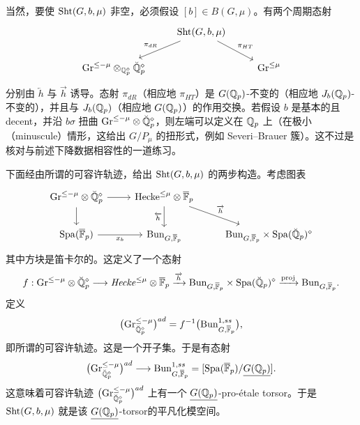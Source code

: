 当然，要使 $\operatorname{Sht}(G,b,\mu)$ 非空，必须假设 $[b]\in B(G,\mu)$。有两个周期态射
\begin{equation*}
\begin{tikzcd}
& \Sht(G,b,\mu) \arrow[dl,"\pi_{dR}"'] \arrow[dr,"\pi_{HT}"] & \\
\Gr^{\le-\mu}\otimes_{\QQ_p^{\diamond}}\breve{\QQ}_p^{\diamond} & & \Gr^{\le\mu}
\end{tikzcd}
\end{equation*}
分别由 $\overleftarrow{h}$ 与 $\overrightarrow{h}$ 诱导。态射 $\pi_{dR}$（相应地 $\pi_{HT}$）是 $G(\mathbb{Q}_p)$-不变的（相应地 $J_b(\mathbb{Q}_p)$-不变的），并且与 $J_b(\mathbb{Q}_p)$（相应地 $G(\mathbb{Q}_p)$）的作用交换。若假设 $b$ 是基本的且 decent，并沿 $b\sigma$ 扭曲 $\mathrm{Gr}^{\le-\mu}\otimes\breve{\mathbb{Q}}_p^{\diamond}$，则左端可以定义在 $\mathbb{Q}_p$ 上（在极小（minuscule）情形，这给出 $G/P_\mu$ 的扭形式，例如 Severi--Brauer 簇）。这不过是核对与前述下降数据相容性的一道练习。


下面经由所谓的可容许轨迹，给出 $\operatorname{Sht}(G,b,\mu)$ 的两步构造。考虑图表
\begin{equation*}
\begin{tikzcd}
\Gr^{\le-\mu}\otimes\breve{\QQ}_p^{\diamond} \arrow[r] \arrow[d]
& \mathrm{Hecke}^{\le\mu}\otimes\ol{\FF}_p \arrow[d,"\overleftarrow{h}"'] \arrow[dr,"\overrightarrow{h}"] & \\
\Spa(\ol{\FF}_p) \arrow[r,"x_b"']
& \Bun_{G,\ol{\FF}_p} & \Bun_{G,\ol{\FF}_p}\times\Spa(\breve{\QQ}_p)^{\diamond}
\end{tikzcd}
\end{equation*}
其中方块是笛卡尔的。这定义了一个态射
\[
f:\mathrm{Gr}^{\le-\mu}\otimes\breve{\mathbb{Q}}_p^{\diamond}\longrightarrow\mathit{Hecke}^{\le\mu}\otimes\overline{\mathbb{F}}_p\xrightarrow{\overrightarrow{h}}\mathrm{Bun}_{G,\overline{\mathbb{F}}_p}\times\mathrm{Spa}(\breve{\mathbb{Q}}_p)^{\diamond}\xrightarrow{\mathrm{proj}}\mathrm{Bun}_{G,\overline{\mathbb{F}}_p}.
\]
定义
\[
\big(\mathrm{Gr}^{\le-\mu}_{\breve{\mathbb{Q}}_p^{\diamond}}\big)^{ad}=f^{-1}\big(\mathrm{Bun}^{1,ss}_{G,\overline{\mathbb{F}}_p}\big),
\]
即所谓的可容许轨迹。这是一个开子集。于是有态射
\[
\big(\mathrm{Gr}^{\le-\mu}_{\breve{\mathbb{Q}}_p^{\diamond}}\big)^{ad}\longrightarrow\mathrm{Bun}^{1,ss}_{G,\overline{\mathbb{F}}_p}=[\mathrm{Spa}(\overline{\mathbb{F}}_p)/\underline{G(\mathbb{Q}_p)}].
\]
这意味着可容许轨迹 $\big(\mathrm{Gr}^{\le-\mu}_{\breve{\mathbb{Q}}_p^{\diamond}}\big)^{ad}$ 上有一个 $\underline{G(\mathbb{Q}_p)}$-pro-étale torsor。于是 $\operatorname{Sht}(G,b,\mu)$ 就是该 $\underline{G(\mathbb{Q}_p)}$-torsor的平凡化模空间。

